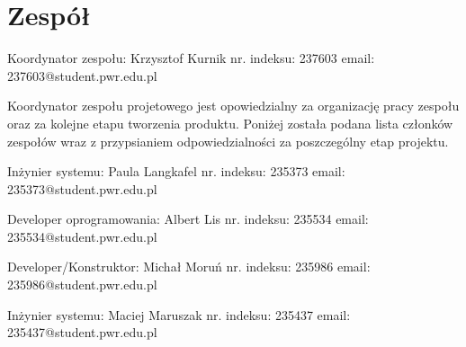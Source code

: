 \documentclass[10pt, a4paper]{article}
\begin{document}
\section{Zespół}
\begin{description}[font=$\bullet$~\normalfont]
\item Koordynator zespołu: Krzysztof Kurnik nr. indeksu: 237603 email: 237603@student.pwr.edu.pl
\end{description}
Koordynator zespołu projetowego jest opowiedzialny za organizację pracy zespołu oraz za kolejne etapu tworzenia produktu. Poniżej została podana lista członków zespołów wraz z przypsianiem odpowiedzialności za poszczególny etap projektu.
\begin{description}[font=$\bullet$~\normalfont]
\item Inżynier systemu: Paula Langkafel nr. indeksu: 235373 email: 235373@student.pwr.edu.pl
\item Developer oprogramowania: Albert Lis nr. indeksu: 235534 email: 235534@student.pwr.edu.pl
\item Developer/Konstruktor: Michał Moruń nr. indeksu: 235986 email: 235986@student.pwr.edu.pl
\item Inżynier systemu: Maciej Maruszak nr. indeksu: 235437 email: 235437@student.pwr.edu.pl
\end{description}
\end{document}
